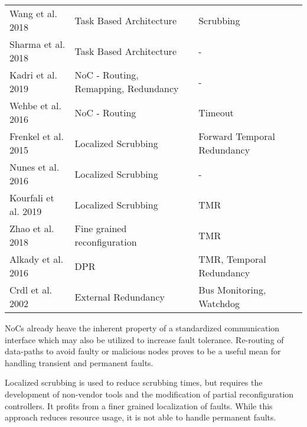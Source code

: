 \begin{strip}
\begin{tabularx}{\textwidth}{lll >{\arraybackslash}X}
       \cite{wang_dynamic_2018} Wang et al. 2018            & Task Based Architecture      & Scrubbing \\
       \cite{sharma_run-time_2018} Sharma et al. 2018       & Task Based Architecture      & - \\
       \cite{kadri_survey_2019} Kadri et al. 2019           & NoC - Routing, Remapping, Redundancy                        & - \\
       \cite{wehbe_secure_2016} Wehbe et al. 2016           & NoC - Routing               & Timeout\\
       \cite{frenkel2015} Frenkel et al. 2015               & Localized Scrubbing       & Forward Temporal Redundancy \\
       \cite{nunes_improving_2016} Nunes et al. 2016        & Localized Scrubbing         & - \\
       \cite{kourfali2019} Kourfali et al. 2019             & Localized Scrubbing           & TMR \\
       \cite{zhao_fine-grained_2018} Zhao et al. 2018       & Fine grained reconfiguration & TMR \\
       \cite{alkady_integration_2016} Alkady et al. 2016    & \gls{DPR}             & TMR, Temporal Redundancy \\
       \cite{crdl_fail-safe_2002} Crdl et al. 2002          & External Redundancy           & Bus Monitoring, Watchdog \\
       \bottomrule
   \end{tabularx}
\end{strip}
\glspl{NoC} already heave the inherent property of a standardized communication interface which may also be utilized to increase fault tolerance.
Re-routing of data-paths to avoid faulty or malicious nodes proves to be a useful mean for handling transient and permanent faults.

Localized scrubbing is used to reduce scrubbing times, but requires the development of non-vendor tools and the modification of partial reconfiguration controllers.
It profits from a finer grained localization of faults.
While this approach reduces resource usage, it is not able to handle permanent faults. 
